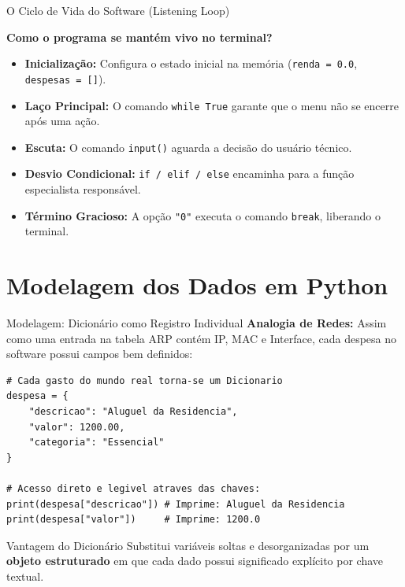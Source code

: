 \documentclass[10pt]{beamer}
\begin{document}
\begin{frame}{O Ciclo de Vida do Software (Listening Loop)}
    \begin{center}
        \textbf{Como o programa se mantém vivo no terminal?}
    \end{center}

    \begin{itemize}
        \item \textbf{Inicialização:} Configura o estado inicial na memória (\texttt{renda = 0.0}, \texttt{despesas = []}).
        \item \textbf{Laço Principal:} O comando \texttt{while True} garante que o menu não se encerre após uma ação.
        \item \textbf{Escuta:} O comando \texttt{input()} aguarda a decisão do usuário técnico.
        \item \textbf{Desvio Condicional:} \texttt{if / elif / else} encaminha para a função especialista responsável.
        \item \textbf{Término Gracioso:} A opção \texttt{"0"} executa o comando \texttt{break}, liberando o terminal.
    \end{itemize}
\end{frame}

\section{Modelagem dos Dados em Python}

\begin{frame}[fragile]{Modelagem: Dicionário como Registro Individual}
    \textbf{Analogia de Redes:} Assim como uma entrada na tabela ARP contém IP, MAC e Interface, cada despesa no software possui campos bem definidos:

    \vspace{0.2cm}
    \begin{lstlisting}
# Cada gasto do mundo real torna-se um Dicionario
despesa = {
    "descricao": "Aluguel da Residencia",
    "valor": 1200.00,
    "categoria": "Essencial"
}

# Acesso direto e legivel atraves das chaves:
print(despesa["descricao"]) # Imprime: Aluguel da Residencia
print(despesa["valor"])     # Imprime: 1200.0
    \end{lstlisting}

    \vspace{0.2cm}
    \begin{block}{Vantagem do Dicionário}
        Substitui variáveis soltas e desorganizadas por um \textbf{objeto estruturado} em que cada dado possui significado explícito por chave textual.
    \end{block}
\end{frame}
\end{document}
